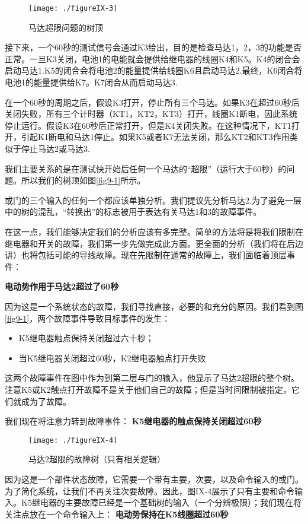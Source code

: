 \documentclass[cn,11pt,chinese]{elegantbook}
\begin{document}
{\begin{figure}[H]
	\texttt{[image: ./figureIX-3]}
	\caption{马达超限问题的树顶}
\end{figure}


接下来，一个60秒的测试信号会通过K3给出，目的是检查马达1，2，3的功能是否正常。一旦K3关闭，电池1的电能就会提供给继电器的线圈K4和K5。K4的闭合会启动马达1.K5的闭合会将电池2的能量提供给线圈K6且启动马达2.最终，K6闭合将电池1的能量提供给K7。K7闭合从而启动马达3.

在一个60秒的周期之后，假设K3打开，停止所有三个马达。如果K3在超过60秒后关闭失败，所有三个计时器（KT1，KT2，KT3）打开，线圈K1断电，因此系统停止运行。假设K3在60秒后正常打开，但是K4关闭失败。在这种情况下，KT1打开，引起K1断电和马达1停止。如果K5或者K7无法关闭，那么KT2和KT3作用类似于停止马达2或马达3.

我们主要关系的是在测试快开始后任何一个马达的“超限”（运行大于60秒）的问题。所以我们的树顶如图\ref{fig9-1}所示。

或门的三个输入的任何一个都应该单独分析。我们提议先分析马达2.为了避免一层中的树的混乱，“转换出”的标志被用于表达有关马达1和3的故障事件。

在这一点，我们能够决定我们的分析应该有多完整。简单的方法将是将我们限制在继电器和开关的故障，我们第一步先做完成此方面。更全面的分析（我们将在后边讲）也将包括可能的导线故障。现在先限制在通常的故障上，我们面临着顶层事件：

\textbf{电动势作用于马达2超过了60秒}

因为这是一个系统状态的故障，我们寻找直接，必要的和充分的原因。我们看到图\ref{fig9-1}，两个故障事件导致目标事件的发生：
\begin{itemize}
	\item K5继电器触点保持关闭超过六十秒；
	\item 当K5继电器关闭超过60秒，K2继电器触点打开失败
\end{itemize}

这两个故障事件在图中作为到第二层与门的输入，他显示了马达2超限的整个树。注意K5或K2触点打开故障不是关于他们自己的故障；但是当时间限制被指定，它们就成为了故障。

我们现在将注意力转到故障事件：
\textbf{K5继电器的触点保持关闭超过60秒}

\begin{figure}[htpb]
	\texttt{[image: ./figureIX-4]}
	\caption{马达2超限的故障树（只有相关逻辑）}\label{fig9-4}
\end{figure}

因为这是一个部件状态故障，它需要一个带有主要，次要，以及命令输入的或门。为了简化系统，让我们不再关注次要故障。因此，图IX-4展示了只有主要和命令输入。K5继电器的主要故障已经是一个基础树的输入（一个分辨极限）；我们现在将关注点放在一个命令输入上：
\textbf{电动势保持在K5线圈超过60秒}

}
\end{document}
